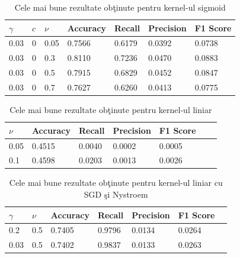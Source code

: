 \begin{table}[H]
    \centering
    \begin{tabularx}{\textwidth}{
        |X
        |X
        |X
        |X
        |X
        |X
        |X|
    }
    \hline
    $\gamma$ & $c$ & $\nu$ & {Accuracy} & {Recall} & {Precision} & {F1 Score} \\
    \hline
    \rowcolor{gray!20} 0.03 & 0 & 0.05 & 0.7566 & 0.6179 & 0.0392 & 0.0738 \\
    0.03 & 0 & 0.3 & 0.8110 & 0.7236 & 0.0470 & 0.0883 \\
    \rowcolor{gray!20} 0.03 & 0 & 0.5 & 0.7915 & 0.6829 & 0.0452 & 0.0847 \\
    0.03 & 0 & 0.7 & 0.7627 & 0.6260 & 0.0413 & 0.0775 \\
    \hline
  \end{tabularx}
  \caption{Cele mai bune rezultate obţinute pentru kernel-ul sigmoid}
\end{table}

\begin{table}[H]
    \centering
    \begin{tabularx}{\textwidth}{
        |X
        |X
        |X
        |X
        |X
        |X
        |X|
    }
    \hline
    $\nu$ & {Accuracy} & {Recall} & {Precision} & {F1 Score} \\
    \hline
    \rowcolor{gray!20} 0.05 & 0.4515 & 0.0040 & 0.0002 & 0.0005 \\
    0.1 & 0.4598 & 0.0203 & 0.0013 & 0.0026 \\
    \hline
  \end{tabularx}
  \caption{Cele mai bune rezultate obţinute pentru kernel-ul liniar}
\end{table}

\begin{table}[H]
    \centering
    \begin{tabularx}{\textwidth}{
        |X
        |X
        |X
        |X
        |X
        |X
        |X|
    }
    \hline
    $\gamma$ & $\nu$ & {Accuracy} & {Recall} & {Precision} & {F1 Score} \\
    \hline
    \rowcolor{gray!20} 0.2 & 0.5 & 0.7405 & 0.9796 & 0.0134 & 0.0264 \\
    0.03 & 0.5 & 0.7402 & 0.9837 &  0.0133 &   0.0263 \\
    \hline
  \end{tabularx}
  \caption{Cele mai bune rezultate obţinute pentru kernel-ul liniar cu SGD şi Nystroem}
\end{table}

